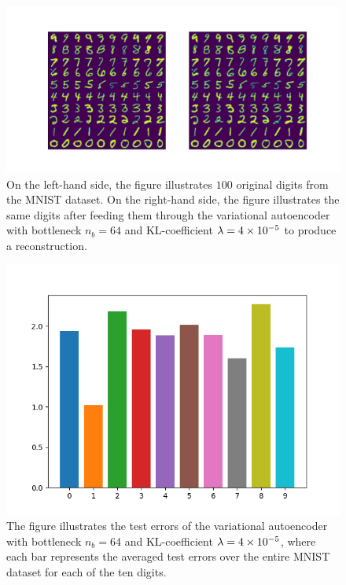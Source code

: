 \begin{figure}
\begin{center}
      \includegraphics[trim = 15mm 10mm 15mm 15mm, clip, width=\linewidth]{convolutional_VAE_snd_KL_4e-5_10k_epochs_64D_inference}
\end{center}
\caption{On the left-hand side, the figure illustrates $100$ original digits from the MNIST dataset. On the right-hand side, the figure illustrates the same digits after feeding them through the variational autoencoder with bottleneck $n_b=64$ and KL-coefficient $\lambda = \num{4e-5}$ to produce a reconstruction.}\label{fig:convolutional_VAE_snd_KL_4e-5_10k_epochs_64D_inference}
\end{figure}


\begin{figure}
\begin{center}
      \includegraphics[width=0.49\linewidth]{convolutional_VAE_snd_KL_4e-5_10k_epochs_64D_errors}
\end{center}
\caption{The figure illustrates the test errors of the variational autoencoder with bottleneck $n_b=64$ and KL-coefficient $\lambda = \num{4e-5}$, where each bar represents the averaged test errors over the entire MNIST dataset for each of the ten digits.}\label{fig:convolutional_VAE_snd_KL_4e-5_10k_epochs_64D_errors}
\end{figure}


